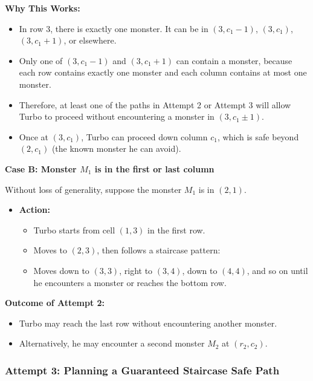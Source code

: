\begin{tcolorbox}[enhanced, breakable, rounded corners,
    colback=gray!5!white, colframe=gray!75!black,
    colbacktitle=gray!85!black, fonttitle=\bfseries, coltitle=white, title=2024 IMO Problem 5]
\textbf{Why This Works:}

\begin{itemize}
    \item In row 3, there is exactly one monster. It can be in $ (3, c_1 - 1) $, $ (3, c_1) $, $ (3, c_1 + 1) $, or elsewhere.
    \item Only one of $ (3, c_1 - 1) $ and $ (3, c_1 + 1) $ can contain a monster, because each row contains exactly one monster and each column contains at most one monster.
    \item Therefore, at least one of the paths in Attempt 2 or Attempt 3 will allow Turbo to proceed without encountering a monster in $ (3, c_1 \pm 1) $.
    \item Once at $ (3, c_1) $, Turbo can proceed down column $ c_1 $, which is safe beyond $ (2, c_1) $ (the known monster he can avoid).
\end{itemize}


\textbf{Case B: Monster \( M_1 \) is in the first or last column}

Without loss of generality, suppose the monster $ M_1 $ is in $ (2,1) $.

\begin{itemize}
    \item \textbf{Action:}
    \begin{itemize}
        \item Turbo starts from cell $ (1,3) $ in the first row.
        \item Moves to $ (2,3) $, then follows a staircase pattern:
        \item Moves down to $ (3,3) $, right to $ (3,4) $, down to $ (4,4) $, and so on until he encounters a monster or reaches the bottom row.
    \end{itemize}
\end{itemize}

\textbf{Outcome of Attempt 2:}

\begin{itemize}
    \item Turbo may reach the last row without encountering another monster.
    \item Alternatively, he may encounter a second monster $ M_2 $ at $ (r_2, c_2) $.
\end{itemize}

\subsubsection*{Attempt 3: Planning a Guaranteed Staircase Safe Path}


\end{tcolorbox}
